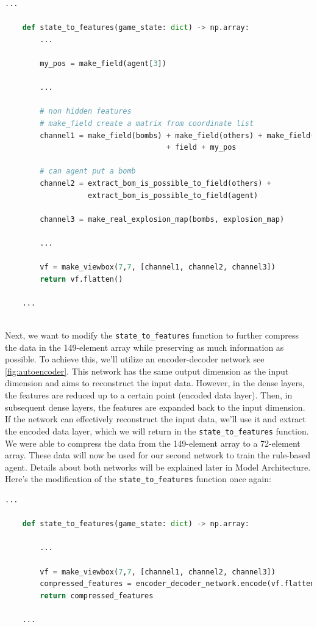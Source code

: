 \begin{lstlisting}[language=Python]
    ...

    def state_to_features(game_state: dict) -> np.array:
        ...

        my_pos = make_field(agent[3])

        ...

        # non hidden features
        # make_field create a matrix from coordinate list
        channel1 = make_field(bombs) + make_field(others) + make_field(coins) 
                                     + field + my_pos

        # can agent put a bomb
        channel2 = extract_bom_is_possible_to_field(others) +  
                   extract_bom_is_possible_to_field(agent)

        channel3 = make_real_explosion_map(bombs, explosion_map)

        ...

        vf = make_viewbox(7,7, [channel1, channel2, channel3])
        return vf.flatten()

    ...
    
\end{lstlisting}

Next, we want to modify the \verb|state_to_features| function to further compress the data in the 149-element array while preserving as much information as possible. 
To achieve this, we'll utilize an encoder-decoder network see \autoref{fig:autoencoder}. This network has the same output dimension as the 
input dimension and aims to reconstruct the 
input data. However, in the dense layers, the features are reduced up to a certain point (encoded data layer). Then, in subsequent dense layers, the 
features are expanded back to the input dimension. If the network can effectively reconstruct the input data, we'll use it and extract the encoded data layer, 
which we will return in the \verb|state_to_features| function. We were able to compress the data from the 149-element array to a 72-element array. These data will 
now be used for our second network to train the rule-based agent. Details about both networks will be explained later 
in Model Architecture. Here's the modification of the \verb|state_to_features| function once again:

\begin{lstlisting}[language=Python]
    ...

    def state_to_features(game_state: dict) -> np.array:

        ...

        vf = make_viewbox(7,7, [channel1, channel2, channel3])
        compressed_features = encoder_decoder_network.encode(vf.flatten(), 72)
        return compressed_features

    ...

\end{lstlisting}

